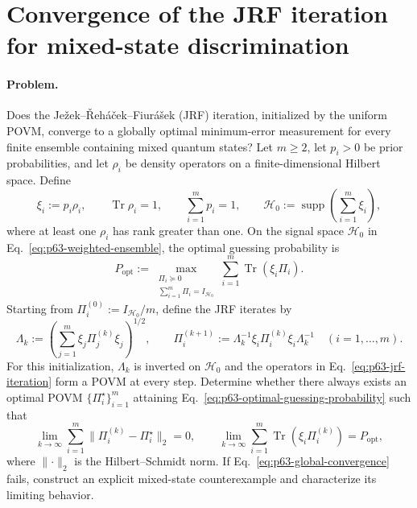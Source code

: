 \section{Convergence of the JRF iteration for mixed-state discrimination}
\label{sec:problem-63}

\paragraph{Problem.}
Does the Je\v{z}ek--\v{R}eh\'{a}\v{c}ek--Fiur\'{a}\v{s}ek (JRF) iteration,
initialized by the uniform POVM, converge to a globally optimal
minimum-error measurement for every finite ensemble containing mixed quantum
states?  Let $m\geq2$, let $p_i>0$ be prior probabilities, and let $\rho_i$ be
density operators on a finite-dimensional Hilbert space.  Define
\begin{equation}
  \xi_i:=p_i\rho_i,
  \qquad
  \operatorname{Tr}\rho_i=1,
  \qquad
  \sum_{i=1}^{m}p_i=1,
  \qquad
  \mathcal H_0:=\operatorname{supp}\!\left(\sum_{i=1}^{m}\xi_i\right),
  \label{eq:p63-weighted-ensemble}
\end{equation}
where at least one $\rho_i$ has rank greater than one.  On the signal space
$\mathcal H_0$ in Eq.~\eqref{eq:p63-weighted-ensemble}, the optimal guessing
probability is
\begin{equation}
  P_{\mathrm{opt}}
  :=\max_{\substack{\Pi_i\succeq0\\
                    \sum_{i=1}^{m}\Pi_i=I_{\mathcal H_0}}}
       \sum_{i=1}^{m}\operatorname{Tr}(\xi_i\Pi_i).
  \label{eq:p63-optimal-guessing-probability}
\end{equation}
Starting from $\Pi_i^{(0)}:=I_{\mathcal H_0}/m$, define the JRF iterates by
\begin{equation}
  \Lambda_k
  :=\left(\sum_{j=1}^{m}
       \xi_j\Pi_j^{(k)}\xi_j\right)^{1/2},
  \qquad
  \Pi_i^{(k+1)}
  :=\Lambda_k^{-1}\xi_i\Pi_i^{(k)}\xi_i\Lambda_k^{-1}
  \quad (i=1,\ldots,m).
  \label{eq:p63-jrf-iteration}
\end{equation}
For this initialization, $\Lambda_k$ is inverted on $\mathcal H_0$ and the
operators in Eq.~\eqref{eq:p63-jrf-iteration} form a POVM at every step.
Determine whether there always exists an optimal POVM
$\{\Pi_i^\star\}_{i=1}^{m}$ attaining
Eq.~\eqref{eq:p63-optimal-guessing-probability} such that
\begin{equation}
  \lim_{k\to\infty}
       \sum_{i=1}^{m}\lVert\Pi_i^{(k)}-\Pi_i^\star\rVert_2=0,
  \qquad
  \lim_{k\to\infty}
       \sum_{i=1}^{m}\operatorname{Tr}(\xi_i\Pi_i^{(k)})
       =P_{\mathrm{opt}},
  \label{eq:p63-global-convergence}
\end{equation}
where $\lVert\cdot\rVert_2$ is the Hilbert--Schmidt norm.  If
Eq.~\eqref{eq:p63-global-convergence} fails, construct an explicit
mixed-state counterexample and characterize its limiting behavior.

